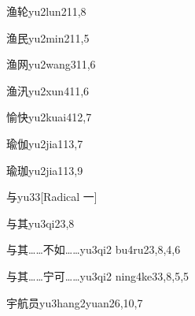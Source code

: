 \begin{entry}{渔轮}{yu2lun2}{11,8}
\end{entry}

\begin{entry}{渔民}{yu2min2}{11,5}
\end{entry}

\begin{entry}{渔网}{yu2wang3}{11,6}
\end{entry}

\begin{entry}{渔汛}{yu2xun4}{11,6}
\end{entry}

\begin{entry}{愉快}{yu2kuai4}{12,7}
\end{entry}

\begin{entry}{瑜伽}{yu2jia1}{13,7}
\end{entry}

\begin{entry}{瑜珈}{yu2jia1}{13,9}
\end{entry}

\begin{entry}{与}{yu3}{3}[Radical 一]
\end{entry}

\begin{entry}{与其}{yu3qi2}{3,8}
\end{entry}

\begin{entry}{与其……不如……}{yu3qi2 bu4ru2}{3,8,4,6}
\end{entry}

\begin{entry}{与其……宁可……}{yu3qi2 ning4ke3}{3,8,5,5}
\end{entry}

\begin{entry}{宇航员}{yu3hang2yuan2}{6,10,7}
\end{entry}

